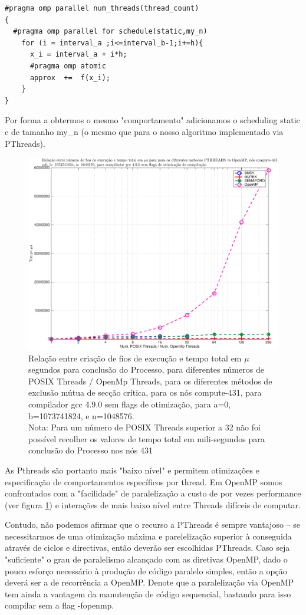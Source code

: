 \documentclass[conference,compsoc]{IEEEtran}
\begin{document}
{\small
\begin{lstlisting}
#pragma omp parallel num_threads(thread_count)
{
  #pragma omp parallel for schedule(static,my_n)
    for (i = interval_a ;i<=interval_b-1;i+=h){
      x_i = interval_a + i*h;
      #pragma omp atomic      
      approx  +=  f(x_i);
    }
}
\end{lstlisting}
}



Por forma a obtermos o mesmo "comportamento" adicionamos o scheduling static e de tamanho my\_n (o mesmo que para o nosso algoritmo implementado via PThreads).


\begin{figure}[H]
\centering
\includegraphics[width=1.1\columnwidth]{EPS/time_omp.eps}
\caption{Relação entre criação de fios de execução e tempo total em $\mu$ segundos para conclusão do Processo, para diferentes números de POSIX Threads / OpenMp Threads, para os diferentes métodos de exclusão mútua de secção crítica, para os nós compute-431, para compilador gcc 4.9.0 sem flags de otimização, para a=0, b=1073741824, e n=1048576.  \\{Nota: Para um número de POSIX Threads superior a 32 não foi possível recolher os valores de tempo total em mili-segundos para conclusão do Processo nos nós 431} }
\label{fig:time_omp}
\end{figure}

As Pthreads são portanto mais "baixo nível" e permitem otimizações e especificação de comportamentos específicos por thread.
Em OpenMP somos confrontados com a "facilidade" de paralelização a custo de por vezes performance (ver figura \ref{fig:time_omp}) e interações de mais baixo nível entre Threads difíceis de computar. \par 
Contudo, não podemos afirmar que o recurso a PThreads é sempre vantajoso -- se necessitarmos de uma otimização máxima e parelelização superior à conseguida através de ciclos e directivas, então deverão ser escolhidas PThreads. Caso seja "suficiente" o grau de paralelismo alcançado com as diretivas OpenMP, dado o pouco esforço necessário à produção de código paralelo simples, então a opção deverá ser a de recorrência a OpenMP. Denote que a paralelização via OpenMP tem ainda a vantagem da  manutenção de código sequencial, bastando para isso compilar sem a flag -fopenmp.
\end{document}
